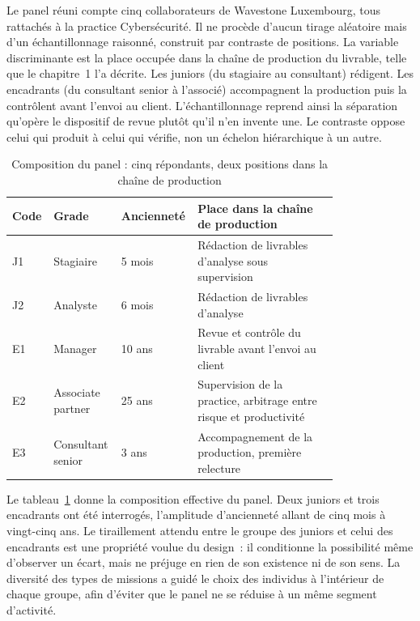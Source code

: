 Le panel réuni compte cinq collaborateurs de Wavestone Luxembourg, tous rattachés à la
practice Cybersécurité. Il ne procède d'aucun tirage aléatoire mais d'un échantillonnage
raisonné, construit par contraste de positions. La variable discriminante est la place
occupée dans la chaîne de production du livrable, telle que le chapitre~1 l'a décrite.
Les juniors (du stagiaire au consultant) rédigent. Les encadrants (du consultant senior
à l'associé) accompagnent la production puis la contrôlent avant l'envoi au client.
L'échantillonnage reprend ainsi la séparation qu'opère le dispositif de revue plutôt
qu'il n'en invente une. Le contraste oppose celui qui produit à celui qui vérifie, non
un échelon hiérarchique à un autre.

\begin{table}[h]
\centering
\small
\begin{tabular}{|p{0.06\linewidth}|p{0.20\linewidth}|p{0.12\linewidth}|p{0.42\linewidth}|}
\hline
\textbf{Code} & \textbf{Grade} & \textbf{Ancienneté} & \textbf{Place dans la chaîne de production} \\
\hline
J1 & Stagiaire & 5 mois & Rédaction de livrables d'analyse sous supervision \\
\hline
J2 & Analyste & 6 mois & Rédaction de livrables d'analyse \\
\hline
E1 & Manager & 10 ans & Revue et contrôle du livrable avant l'envoi au client \\
\hline
E2 & Associate partner & 25 ans & Supervision de la practice, arbitrage entre risque et productivité \\
\hline
E3 & Consultant senior & 3 ans & Accompagnement de la production, première relecture \\
\hline
\end{tabular}
\caption{Composition du panel : cinq répondants, deux positions dans la chaîne de production}
\label{tab:panel-chap3}
\end{table}

Le tableau~\ref{tab:panel-chap3} donne la composition effective du panel. Deux juniors
et trois encadrants ont été interrogés, l'amplitude d'ancienneté allant de cinq mois à
vingt-cinq ans. Le tiraillement attendu entre le groupe des juniors et celui des
encadrants est une propriété voulue du design~: il conditionne la possibilité même
d'observer un écart, mais ne préjuge en rien de son existence ni de son sens. La
diversité des types de missions a guidé le choix des individus à l'intérieur de chaque
groupe, afin d'éviter que le panel ne se réduise à un même segment d'activité.

